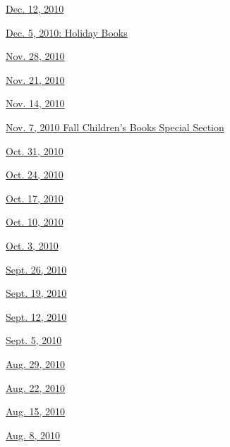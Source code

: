 \href{http://www.nytimes3xbfgragh.onion/indexes/2010/12/11/books/review/index.html}{Dec.
12, 2010}

\href{http://www.nytimes3xbfgragh.onion/indexes/2010/12/04/books/review/index.html}{Dec.
5, 2010: Holiday Books}

\href{http://www.nytimes3xbfgragh.onion/indexes/2010/11/27/books/review/index.html}{Nov.
28, 2010}

\href{http://www.nytimes3xbfgragh.onion/indexes/2010/11/20/books/review/index.html}{Nov.
21, 2010}

\href{http://www.nytimes3xbfgragh.onion/indexes/2010/11/13/books/review/index.html}{Nov.
14, 2010}

\href{http://www.nytimes3xbfgragh.onion/indexes/2010/11/06/books/review/index.html}{Nov.
7, 2010 \textbar{} Fall Children's Books Special Section}

\href{http://www.nytimes3xbfgragh.onion/indexes/2010/10/30/books/review/index.html}{Oct.
31, 2010}

\href{http://www.nytimes3xbfgragh.onion/indexes/2010/10/23/books/review/index.html}{Oct.
24, 2010}

\href{http://www.nytimes3xbfgragh.onion/indexes/2010/10/16/books/review/index.html}{Oct.
17, 2010}

\href{http://www.nytimes3xbfgragh.onion/indexes/2010/10/09/books/review/index.html}{Oct.
10, 2010}

\href{http://www.nytimes3xbfgragh.onion/indexes/2010/10/02/books/review/index.html}{Oct.
3, 2010}

\href{http://www.nytimes3xbfgragh.onion/indexes/2010/09/25/books/review/index.html}{Sept.
26, 2010}

\href{http://www.nytimes3xbfgragh.onion/indexes/2010/09/18/books/review/index.html}{Sept.
19, 2010}

\href{http://www.nytimes3xbfgragh.onion/indexes/2010/09/11/books/review/index.html}{Sept.
12, 2010}

\href{http://www.nytimes3xbfgragh.onion/indexes/2010/09/05/books/review/index.html}{Sept.
5, 2010}

\href{http://www.nytimes3xbfgragh.onion/indexes/2010/08/28/books/review/index.html}{Aug.
29, 2010}

\href{http://www.nytimes3xbfgragh.onion/indexes/2010/08/21/books/review/index.html}{Aug.
22, 2010}

\href{http://www.nytimes3xbfgragh.onion/indexes/2010/08/14/books/review/index.html}{Aug.
15, 2010}

\href{http://www.nytimes3xbfgragh.onion/indexes/2010/08/07/books/review/index.html}{Aug.
8, 2010}

